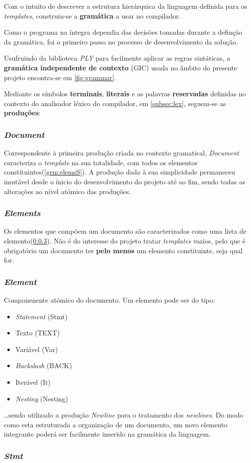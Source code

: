 \documentclass[../relatorio.tex]{subfiles}
\begin{document}
Com o intuito de descrever a estrutura hierárquica da linguagem
definida para os \textit{templates}, construiu-se a \textbf{gramática} 
a usar no compilador. 

Como o programa na íntegra dependia das decisões tomadas durante
a definção da gramática, foi o primeiro passo no processo de desenvolvimento
da solução. 

Usufruindo da biblioteca \textit{PLY} para facilmente aplicar as 
regras sintáticas, a \textbf{gramática independente de contexto} (GIC) usada 
no âmbito do presente projeto encontra-se em \ref{fig:grammar}.

Mediante os símbolos \textbf{terminais}, \textbf{literais} e as palavras 
\textbf{reservadas} definidas no contexto do analisador léxico do 
compilador, em \ref{subsec:lex}, seguem-se as \textbf{produções}:

\subsubsection{\textit{Document}}\label{grm:doc}
Correspondente à primeira produção criada no contexto gramatical,
\textit{Document} caracteriza o \textit{template} na sua totalidade,
com todos os elementos constituintes(\ref{grm:elemsS}).
A produção dada à sua simplicidade permaneceu imutável desde o ínicio
do desenvolvimento do projeto até ao fim, sendo todas as alterações 
ao nível atómico das produções.

\subsubsection{\textit{Elements}} \label{grm:elems}
Os elementos que compõem um documento são caracterizados como uma lista 
de elemento(\ref{grm:elem}). 
Não é do interesse do projeto tratar \textit{templates} vazios, pelo que 
é obrigatório um documento ter \textbf{pelo menos} um 
elemento constituinte, seja qual for. 

\subsubsection{\textit{Element}}\label{grm:elem}
Componenente atómico do documento. 
Um elemento pode ser do tipo:
\begin{itemize}
    \item \textit{Statement}    (Stmt)
    \item Texto                 (TEXT)
    \item Variável              (Var)
    \item \textit{Backslash}    (BACK)
    \item Iterável              (It)
    \item \textit{Nesting}      (Nesting)
\end{itemize}
\dots sendo utilizado a produção \textit{Newline} para o tratamento 
dos \textit{newlines}.
Do modo como esta estruturada a organização de um documento, 
um novo elemento integrante poderá ser facilmente inserido
na gramática da linguagem.

\subsubsection{\textit{Stmt}}
\end{document}
